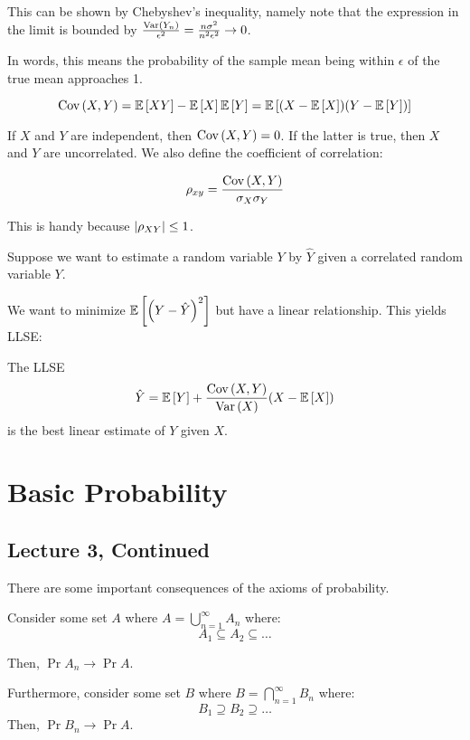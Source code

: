 This can be shown by Chebyshev's inequality, namely note that the expression in the limit
is bounded by $\frac{\text{Var}\left( Y_n \right)}{\epsilon^2} = \frac{n\sigma^2}{n^2\epsilon^2} \to 0$.

In words, this means the probability of the sample mean being within $\epsilon$ of the true mean
approaches 1.

\begin{definition} [Covariance]
    \[ \text{Cov}\left( X, Y \right) = \mathbb{E}\left[ XY \right] - \mathbb{E}\left[ X \right]\mathbb{E}\left[ Y \right] = \mathbb{E}\left[ (X - \mathbb{E}\left[ X \right])(Y - \mathbb{E}\left[ Y \right]) \right] \]
\end{definition}

If $X$ and $Y$ are independent, then $\text{Cov}\left( X, Y \right) = 0$. If the latter is true,
then $X$ and $Y$ are uncorrelated. We also define the coefficient of correlation:

\[ \rho_{xy} = \frac{\text{Cov}\left( X, Y \right)}{\sigma_X \sigma_Y} \]

This is handy because $\abs{\rho_{XY}} \leq 1$.

Suppose we want to estimate a random variable $Y$ by $\hat{Y}$ given a correlated
random variable $Y$.

We want to minimize $\mathbb{E}\left[ \qty(Y - \hat{Y})^2 \right]$ but have a linear relationship.
This yields LLSE:

\begin{theorem} 
    The LLSE
    \[ \hat{Y} = \mathbb{E}\left[ Y \right] + \frac{\text{Cov}\left( X, Y \right)}{\text{Var}\left( X \right)}\qty(X - \mathbb{E}\left[ X \right]) \]
    is the best linear estimate of $Y$ given $X$.
\end{theorem}

\section{Basic Probability}

\subsection{Lecture 3, Continued}

There are some important consequences of the axioms of probability.

\begin{theorem} [Convergence]
    Consider some set $A$ where $A = \bigcup_{n = 1}^{\infty} A_n$ where:
    \[ A_1 \subseteq A_2 \subseteq \dots \]

    Then, $\Pr{A_n} \rightarrow \Pr{A}$.

    Furthermore, consider some set $B$ where $B = \bigcap_{n = 1}^{\infty} B_n$ where:
    \[ B_1 \supseteq B_2 \supseteq \dots \]
    Then, $\Pr{B_n} \rightarrow \Pr{A}$.
\end{theorem}

